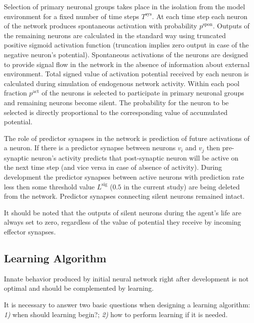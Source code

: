 \documentclass[letterpaper]{article}
\begin{document}
Selection of primary neuronal groups takes place in the isolation from the model environment for a fixed number of time steps $T^{\mathrm{sys}}$. At each time step each neuron of the network produces spontaneous activation with probability $p^{\mathrm{spon}}$. Outputs of the remaining neurons are calculated in the standard way using truncated positive sigmoid activation function (truncation implies zero output in case of the negative neuron's potential). Spontaneous activations of the neurons are designed to provide signal flow in the network in the absence of information about external environment. Total signed value of activation potential received by each neuron is calculated during simulation of endogenous network activity. Within each pool fraction $p^{\mathrm{act}}$ of the neurons is selected to participate in primary neuronal groups and remaining neurons become silent. The probability for the neuron to be selected is directly proportional to the corresponding value of accumulated potential.

The role of predictor synapses in the network is prediction of future activations of a neuron. If there is a predictor synapse between neurons $v_{i}$ and $v_{j}$ then pre-synaptic neuron's activity predicts that post-synaptic neuron will be active on the next time step (and vice versa in case of absence of activity). During development the predictor synapses between active neurons with prediction rate less then some threshold value $L^{\mathrm{sig}}$ ($0.5$ in the current study) are being deleted from the network. Predictor synapses connecting silent neurons remained intact. 

It should be noted that the outputs of silent neurons during the agent's life are always set to zero, regardless of the value of potential they receive by incoming effector synapses.     

\subsection{Learning Algorithm} 

Innate behavior produced by initial neural network right after development is not optimal and should be complemented by learning.

It is necessary to answer two basic questions when designing a learning algorithm: {\em 1)} when should learning begin?; {\em 2)} how to perform learning if it is needed. 
\end{document}
